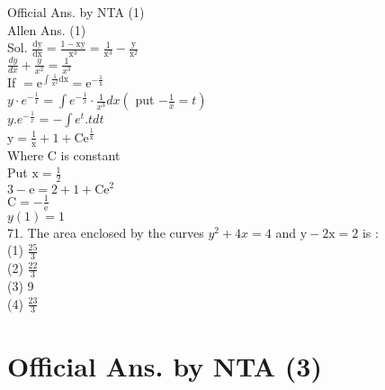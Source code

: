 \documentclass[10pt]{article}
\begin{document}
Official Ans. by NTA (1)\\
Allen Ans. (1)\\
Sol. \(\frac{\mathrm{dy}}{\mathrm{dx}}=\frac{1-\mathrm{xy}}{\mathrm{x}^{3}}=\frac{1}{\mathrm{x}^{3}}-\frac{\mathrm{y}}{\mathrm{x}^{2}}\)\\
\(\frac{d y}{d x}+\frac{y}{x^{2}}=\frac{1}{x^{3}}\)\\
If \(=\mathrm{e}^{\int \frac{1}{\mathrm{x}^{2}} \mathrm{dx}}=\mathrm{e}^{-\frac{1}{\mathrm{x}}}\)\\
\(y \cdot e^{-\frac{1}{x}}=\int e^{-\frac{1}{x}} \cdot \frac{1}{x^{3}} d x\left(\right.\) put \(\left.-\frac{1}{x}=t\right)\)\\
\(y . e^{-\frac{1}{x}}=-\int e^{t} . t d t\)\\
\(\mathrm{y}=\frac{1}{\mathrm{x}}+1+\mathrm{Ce}^{\frac{1}{\mathrm{x}}}\)\\
Where C is constant\\
Put \(\mathrm{x}=\frac{1}{2}\)\\
\(3-\mathrm{e}=2+1+\mathrm{Ce}^{2}\)\\
\(\mathrm{C}=-\frac{1}{\mathrm{e}}\)\\
\(y(1)=1\)\\
71. The area enclosed by the curves \(y^{2}+4 x=4\) and \(\mathrm{y}-2 \mathrm{x}=2\) is :\\
(1) \(\frac{25}{3}\)\\
(2) \(\frac{22}{3}\)\\
(3) 9\\
(4) \(\frac{23}{3}\)

\section*{Official Ans. by NTA (3)}
\end{document}
